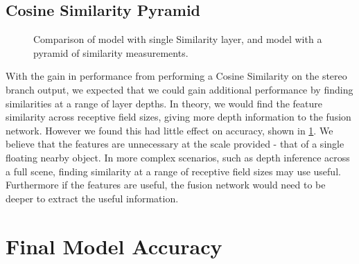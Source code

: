 \documentclass[ %
                    author={Gavin Parker},
                supervisor={Dr. Neill Campbell},
                    degree={MEng},
                     title={Deep Learning for Illumination Estimation from Stereo Images},
                  subtitle={},
                      type={Research},
                      year={2018} ]{dissertation}
\begin{document}
\subsection{Cosine Similarity Pyramid}
\begin{figure}[H]
\setlength\figureheight{6cm}
\setlength\figurewidth{12cm}
\centering

\caption{Comparison of model with single Similarity layer, and model with a pyramid of similarity measurements.}
\label{fig:pyr_comp}
\end{figure}
With the gain in performance from performing a Cosine Similarity on the stereo branch output, we expected that we could gain additional performance by finding similarities at a range of layer depths. In theory, we would find the feature similarity across receptive field sizes, giving more depth information to the fusion network. However we found this had little effect on accuracy, shown in \ref{fig:pyr_comp}. We believe that the features are unnecessary at the scale provided - that of a single floating nearby object. In more complex scenarios, such as depth inference across a full scene, finding similarity at a range of receptive field sizes may use useful. Furthermore if the features are useful, the fusion network would need to be deeper to extract the useful information.
\section{Final Model Accuracy}
\end{document}
